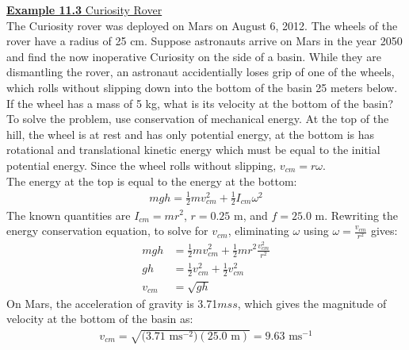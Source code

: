 \documentclass[a4paper]{article}
\let\bf\textbf
\newcommand\m{\text{ m}}
\newcommand\ms{\text{ ms}^{-1}}
\newcommand\mss{\text{ ms}^{-2}}
\begin{document}
\begin{shaded}
    \underline{\bf{Example 11.3} Curiosity Rover}
    \vspace{2mm}\\
    The Curiosity rover was deployed on Mars on August 6, 2012. The wheels of the rover have a radius of 25 cm. Suppose astronauts arrive on Mars in the year 2050 and find the now inoperative Curiosity on the side of a basin. While they are dismantling the rover, an astronaut accidentially loses grip of one of the wheels, which rolls without slipping down into the bottom of the basin 25 meters below. If the wheel has a mass of 5 kg, what is its velocity at the bottom of the basin?\vspace{1mm}\\
    To solve the problem, use conservation of mechanical energy. At the top of the hill, the wheel is at rest and has only potential energy, at the bottom is has rotational and translational kinetic energy which must be equal to the initial potential energy. Since the wheel rolls without slipping, $v_{cm} = r\omega$.
    \vspace{1mm}\\
    The energy at the top is equal to the energy at the bottom:
    \begin{align*}
        mgh = \frac{1}{2}mv_{cm}^2 + \frac{1}{2}I_{cm}\omega^2
    \end{align*}
    The known quantities are $I_{cm} = mr^2$, $r = 0.25$ m, and $f = 25.0$ m. Rewriting the energy conservation equation, to solve for $v_{cm}$, eliminating $\omega$ using $\omega = \frac{v_{cm}}{r^2}$ gives:
    \begin{align*}
        mgh &= \frac{1}{2}mv_{cm}^2 + \frac{1}{2}mr^2\frac{v_{cm}^2}{r^2}\\
        gh &= \frac{1}{2}v_{cm}^2 + \frac{1}{2}v_{cm}^2\\
        v_{cm} &= \sqrt{gh}
    \end{align*}
    On Mars, the acceleration of gravity is 3.71$mss$, which gives the magnitude of velocity at the bottom of the basin as:
    \begin{align*}
        v_{cm} = \sqrt{\big(3.71\mss\big)(25.0\m)} = 9.63\ms
    \end{align*}
\end{shaded}
\newpage
\end{document}
